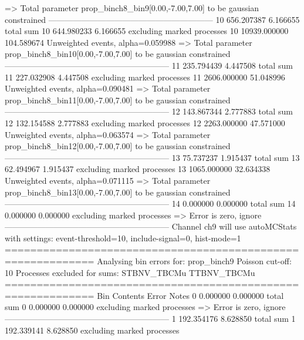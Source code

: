   => Total parameter prop_binch8_bin9[0.00,-7.00,7.00] to be gaussian constrained
------------------------------------------------------------
10         656.207387      6.166655        total sum                     
10         644.980233      6.166655        excluding marked processes    
10         10939.000000    104.589674      Unweighted events, alpha=0.059988
  => Total parameter prop_binch8_bin10[0.00,-7.00,7.00] to be gaussian constrained
------------------------------------------------------------
11         235.794439      4.447508        total sum                     
11         227.032908      4.447508        excluding marked processes    
11         2606.000000     51.048996       Unweighted events, alpha=0.090481
  => Total parameter prop_binch8_bin11[0.00,-7.00,7.00] to be gaussian constrained
------------------------------------------------------------
12         143.867344      2.777883        total sum                     
12         132.154588      2.777883        excluding marked processes    
12         2263.000000     47.571000       Unweighted events, alpha=0.063574
  => Total parameter prop_binch8_bin12[0.00,-7.00,7.00] to be gaussian constrained
------------------------------------------------------------
13         75.737237       1.915437        total sum                     
13         62.494967       1.915437        excluding marked processes    
13         1065.000000     32.634338       Unweighted events, alpha=0.071115
  => Total parameter prop_binch8_bin13[0.00,-7.00,7.00] to be gaussian constrained
------------------------------------------------------------
14         0.000000        0.000000        total sum                     
14         0.000000        0.000000        excluding marked processes    
  => Error is zero, ignore      
------------------------------------------------------------
Channel ch9 will use autoMCStats with settings: event-threshold=10, include-signal=0, hist-mode=1
============================================================
Analysing bin errors for: prop_binch9
Poisson cut-off: 10
Processes excluded for sums: STBNV_TBCMu TTBNV_TBCMu
============================================================
Bin        Contents        Error           Notes                         
0          0.000000        0.000000        total sum                     
0          0.000000        0.000000        excluding marked processes    
  => Error is zero, ignore      
------------------------------------------------------------
1          192.354176      8.628850        total sum                     
1          192.339141      8.628850        excluding marked processes    

